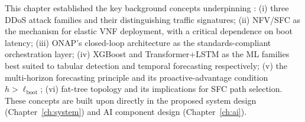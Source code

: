 This chapter established the key background concepts underpinning \padonap{}:
(i) three DDoS attack families and their distinguishing traffic signatures;
(ii) NFV/SFC as the mechanism for elastic VNF deployment, with a critical
dependence on boot latency;
(iii) ONAP's closed-loop architecture as the standards-compliant orchestration
layer;
(iv) XGBoost and Transformer+LSTM as the ML families best suited to
tabular detection and temporal forecasting respectively;
(v) the multi-horizon forecasting principle and its proactive-advantage
condition $h > \ell_{\text{boot}}$;
(vi) fat-tree topology and its implications for SFC path selection.
These concepts are built upon directly in the proposed system design
(Chapter~\ref{ch:system}) and AI component design (Chapter~\ref{ch:ai}).
